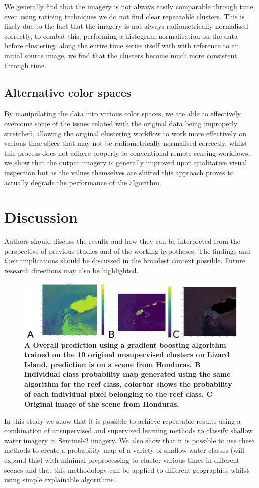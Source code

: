 \documentclass[journal,article,submit,pdftex,moreauthors]{Definitions/mdpi}
\begin{document}
We generally find that the imagery is not always easily comparable through time, even using ratioing techniques we do not find clear repeatable clusters. This is likely due to the fact that the imagery is not always radiometrically normalised correctly, to combat this, 
performing a histogram normalisation on the data before clustering, along the entire time series itself with with reference to an initial source image, we find that the clusters become much more consistent
through time.  



\subsection*{Alternative color spaces}
By manipulating the data into various color spaces, we are able to effectively overcome some of the issues related with the original data being improperly stretched, allowing the original clustering workflow to work more effectively on various time slices that may not be radiometrically
normalised correctly, whilst this process does not adhere properly to conventional remote sensing workflows, we show that the output imagery is generally improved upon qualitative visual inspection but as the values
themselves are shifted this approach proves to actually degrade the performance of the algorithm. 

\section{Discussion}
Authors should discuss the results and how they can be interpreted from the perspective of previous studies and of the working hypotheses. The findings and their implications should be discussed in the broadest context possible. Future research directions may also be highlighted.
\begin{figure}
	\centering
	\includegraphics[width=0.7\linewidth]{Images/Honduras_Prediction.png}
	\caption{\bf{A} Overall prediction using a gradient boosting algorithm trained on the 10 original unsupervised clusters on Lizard Island, prediction is on a scene from Honduras. \bf{B} Individual class probability map generated using the same algorithm for the reef class, colorbar shows the probability of each individual pixel belonging to the reef class.
	\bf{C} Original image of the scene from Honduras.}
	\label{fig:UnsupervisedWorkflow}
\end{figure}
In this study we show that it is possible to achieve repeatable results using a combination of unsupervised and supervised learning methods to classify shallow water imagery in Sentinel-2 imagery. 
We also show that it is possible to use these methods to create a probability map of a variety of shallow water classes (will expand this) with minimal preprocessing to cluster various times in different scenes and that this methodology can be applied to different geographies whilst 
using simple explainable algorithms. 
\end{document}

